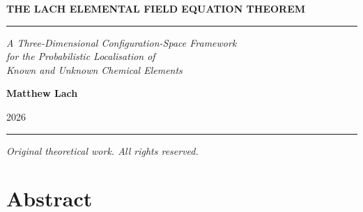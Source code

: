 \documentclass[12pt, a4paper]{article}
\begin{document}

\begin{titlepage}
  \centering
  \vspace*{3cm}

  {\fontsize{22}{26}\selectfont\bfseries\color{titleblue}
    THE LACH ELEMENTAL FIELD EQUATION THEOREM}

  \vspace{0.4cm}
  {\color{ruleblue}\rule{0.8\linewidth}{1pt}}
  \vspace{0.6cm}

  {\large\itshape\color{headblue}
    A Three-Dimensional Configuration-Space Framework\\[4pt]
    for the Probabilistic Localisation of\\[4pt]
    Known and Unknown Chemical Elements}

  \vspace{1.8cm}

  {\Large\bfseries Matthew Lach}

  \vspace{0.4cm}
  {\large 2026}

  \vfill

  {\color{ruleblue}\rule{0.8\linewidth}{0.6pt}}

  \vspace{0.4cm}
  {\small\itshape\color{gray}
    Original theoretical work. All rights reserved.}
\end{titlepage}

\newpage
\section*{Abstract}
\end{document}
